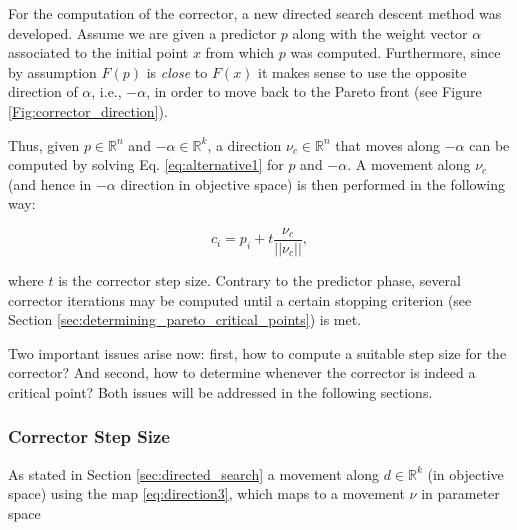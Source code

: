 For the computation of the corrector, a new directed search descent method was developed. Assume we are given a predictor $p$ along with the weight vector $\alpha$ associated to the initial point $x$ from which $p$ was computed. Furthermore, since by assumption $F(p)$ is \emph{close} to $F(x)$ it makes sense to use the opposite direction of $\alpha$, i.e., $-\alpha$, in order to move back to the Pareto front (see Figure \ref{Fig:corrector_direction}).

\begin{comment}

\begin{figure}[H] 
	\centering \def\svgwidth{190pt} 
	 
	\caption{$-\alpha$ taken as steering direction for the corrector} 
	\label{Fig:corrector_direction}
\end{figure}

\end{comment}

Thus, given $p \in \mathbb{R}^n$ and $-\alpha \in \mathbb{R}^k$, a direction $\nu_c \in \mathbb{R}^n$ that moves along $-\alpha$ can be computed by solving Eq. \eqref{eq:alternative1} for $p$ and $-\alpha$. A movement along $\nu_c$ (and hence in $-\alpha$ direction in objective space) is then performed in the following way:

\begin{equation}
c_i = p_i + t \frac{\nu_c}{||\nu_c||},
\label{eq:movement_corrector}
\end{equation}

where $t$ is the corrector step size. Contrary to the predictor phase, several corrector iterations may be computed until a certain stopping criterion (see Section \ref{sec:determining_pareto_critical_points}) is met.

Two important issues arise now: first, how to compute a suitable step size for the corrector? And second, how to determine whenever the corrector is indeed a critical point? Both issues will be addressed in the following sections.

\subsubsection{Corrector Step Size}

As stated in Section \ref{sec:directed_search} a movement along $d \in \mathbb{R}^k$ (in objective space) using the map \eqref{eq:direction3}, which maps to a movement $\nu$ in parameter space

